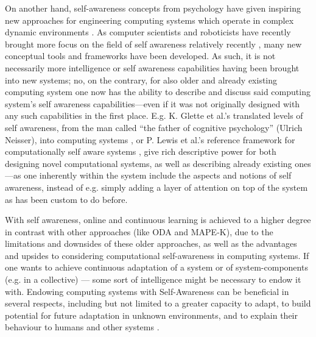On another hand, self-awareness concepts from psychology have given inspiring new approaches for engineering computing systems which operate in complex dynamic environments \cite{sacs16_ch2}. As computer scientists and roboticists have recently brought more focus on the field of self awareness relatively recently \cite{sacs16_ch2, sacs17_ch3}, many new conceptual tools and frameworks have been developed. As such, it is not necessarily more intelligence or self awareness capabilities having been brought into new systems; no, on the contrary, for also older and already existing computing system one now has the ability to describe and discuss said computing system's self awareness capabilities—even if it was not originally designed with any such capabilities in the first place. E.g. K. Glette et al.'s translated levels of self awareness, from the man called ``the father of cognitive psychology'' (Ulrich Neisser), into computing systems \cite{sacs16_ch2}, or P. Lewis et al.'s reference framework for computationally self aware systems \cite{sacs16_ch4}, give rich descriptive power for both designing novel computational systems, as well as describing already existing ones—as one inherently within the system include the aspects and notions of self awareness, instead of e.g. simply adding a layer of attention on top of the system as has been custom to do before.

With self awareness, online and continuous learning is achieved to a higher degree in contrast with other approaches (like ODA and MAPE-K), due to the limitations and downsides of these older approaches, as well as the advantages and upsides to considering computational self-awareness in computing systems. If one wants to achieve continuous adaptation of a system or of system-components (e.g. in a collective) — some sort of intelligence might be necessary to endow it with. Endowing computing systems with Self-Awareness can be beneficial in several respects, including but not limited to a greater capacity to adapt, to build potential for future adaptation in unknown environments, and to explain their behaviour to humans and other systems \cite{sacs17_ch3}.

